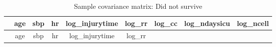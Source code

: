 \documentclass[
]{article}
\begin{document}
\begin{longtable}[]{@{}lcccccccc@{}}
\caption{Sample covariance matrix: Did not survive}\tabularnewline
\toprule
\begin{minipage}[b]{0.09\columnwidth}\raggedright
\strut
\end{minipage} & \begin{minipage}[b]{0.08\columnwidth}\centering
age\strut
\end{minipage} & \begin{minipage}[b]{0.08\columnwidth}\centering
sbp\strut
\end{minipage} & \begin{minipage}[b]{0.09\columnwidth}\centering
hr\strut
\end{minipage} & \begin{minipage}[b]{0.10\columnwidth}\centering
log\_injurytime\strut
\end{minipage} & \begin{minipage}[b]{0.08\columnwidth}\centering
log\_rr\strut
\end{minipage} & \begin{minipage}[b]{0.08\columnwidth}\centering
log\_cc\strut
\end{minipage} & \begin{minipage}[b]{0.09\columnwidth}\centering
log\_ndaysicu\strut
\end{minipage} & \begin{minipage}[b]{0.08\columnwidth}\centering
log\_ncell\strut
\end{minipage}\tabularnewline
\midrule
\endfirsthead
\toprule
\begin{minipage}[b]{0.09\columnwidth}\raggedright
\strut
\end{minipage} & \begin{minipage}[b]{0.08\columnwidth}\centering
age\strut
\end{minipage} & \begin{minipage}[b]{0.08\columnwidth}\centering
sbp\strut
\end{minipage} & \begin{minipage}[b]{0.09\columnwidth}\centering
hr\strut
\end{minipage} & \begin{minipage}[b]{0.10\columnwidth}\centering
log\_injurytime\strut
\end{minipage} & \begin{minipage}[b]{0.08\columnwidth}\centering
log\_rr\strut
\end{minipage} & \begin{minipage}[b]{0.08\columnwidth}\centering

\end{minipage}
\end{longtable}
\end{document}
